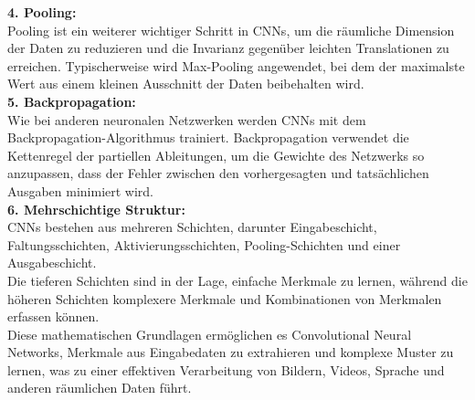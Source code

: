 \documentclass[12pt]{article}
\begin{document}
\textbf{4. Pooling:}\\
Pooling ist ein weiterer wichtiger Schritt in CNNs, um die räumliche Dimension der Daten zu reduzieren und die Invarianz gegenüber leichten Translationen zu erreichen. Typischerweise wird Max-Pooling angewendet, bei dem der maximalste Wert aus einem kleinen Ausschnitt der Daten beibehalten wird.\\[0.2cm]
\textbf{5. Backpropagation:}\\
Wie bei anderen neuronalen Netzwerken werden CNNs mit dem Backpropagation-Algorithmus  trainiert. Backpropagation verwendet die Kettenregel der partiellen Ableitungen, um die Gewichte des Netzwerks so anzupassen, dass der Fehler zwischen den vorhergesagten und tatsächlichen Ausgaben minimiert wird.\\[0.2cm]
\textbf{6. Mehrschichtige Struktur:}\\
CNNs bestehen aus mehreren Schichten, darunter Eingabeschicht, Faltungsschichten, Aktivierungsschichten, Pooling-Schichten und einer Ausgabeschicht.\\
Die tieferen Schichten sind in der Lage, einfache Merkmale zu lernen, während die höheren Schichten komplexere Merkmale und Kombinationen von Merkmalen erfassen können.\\[0.3cm]
Diese mathematischen Grundlagen ermöglichen es Convolutional Neural Networks, Merkmale aus Eingabedaten zu extrahieren und komplexe Muster zu lernen, was zu einer effektiven Verarbeitung von Bildern, Videos, Sprache und anderen räumlichen Daten führt.
%
\end{document}
